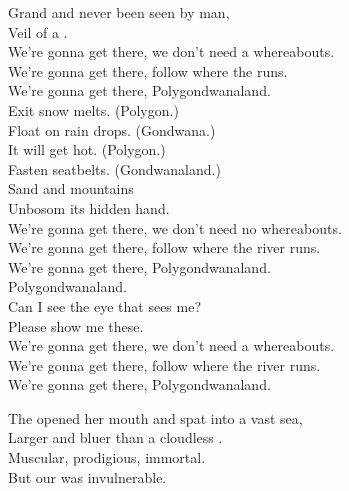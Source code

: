 Grand and never been seen by man, \\
Veil of a . \\

We're gonna get there, we don't need a whereabouts. \\
We're gonna get there, follow where the  runs. \\
We're gonna get there, Polygondwanaland. \\

Exit snow melts. (Polygon.) \\
Float on rain drops. (Gondwana.) \\
It will get hot. (Polygon.) \\
Fasten seatbelts. (Gondwanaland.) \\

Sand and mountains \\
Unbosom its hidden hand. \\

We're gonna get there, we don't need no whereabouts. \\
We're gonna get there, follow where the river runs. \\
We're gonna get there, Polygondwanaland. \\

Polygondwanaland. \\
Can I see the eye that sees me? \\
Please show me these. \\

We're gonna get there, we don't need a whereabouts. \\
We're gonna get there, follow where the river runs. \\
We're gonna get there, Polygondwanaland. \\





The  opened her mouth and spat into a vast sea, \\
Larger and bluer than a cloudless . \\
Muscular, prodigious, immortal. \\
But our  was invulnerable. \\

